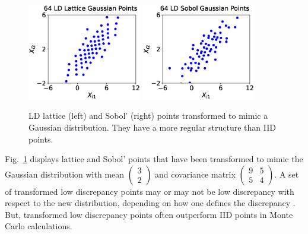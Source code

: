 \documentclass[11pt]{NSFamsart}
\begin{document}
\begin{figure}
	\centering
	\includegraphics[height = 4.2cm]{ProgramsImages/Gauss_lattice.eps} 
	\includegraphics[height = 4.2cm]{ProgramsImages/Gauss_Sobol.eps}
	\caption{LD lattice (left) and Sobol'  (right) points transformed to mimic a Gaussian distribution.  They have a more regular structure than IID points. \label{fig:ld_Gauss}}
\end{figure}

Fig.\ \ref{fig:ld_Gauss} displays  lattice and Sobol' points that have been transformed to mimic the Gaussian distribution with mean $\begin{pmatrix} 3 \\ 2 \end{pmatrix}$ and covariance matrix $\begin{pmatrix} 9 & 5 \\ 5 & 4 \end{pmatrix}$.  A set of transformed low discrepancy points may or may not be low discrepancy with respect to the new distribution, depending on how one defines the discrepancy \cite{LiKanHic20a}.  But, transformed low discrepancy points often outperform IID points in Monte Carlo calculations.

\end{document}
